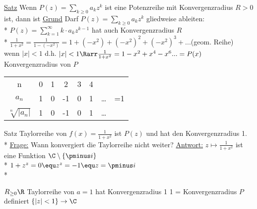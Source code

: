 \ul{Satz} Wenn $P(z) = \sum_{k \geq 0} a_k z^k$ ist eine Potenzreihe mit Konvergenzradius $R > 0$ ist, dann ist
\ul{Grund} Darf $P(z) = \sum_{k \geq 0} a_k z^k$ gliedweise ableiten:\\*
$P(z) = \sum_{k=1}^{\infty} k\cdot a_k z^{k-1}$ hat auch Konvergenzradius $R$\\*
$\frac{1}{1+x^2} = \frac{1}{1 - (-x^2)} = 1 + (-x^2) + (-x^2)^2 + (-x^2)^3 + ... $(geom. Reihe)\\
wenn $|x| < 1$ d.h. $|x| < 1 \Rarr \frac{1}{1+x^2} = 1 - x^2 + x^4 - x^6 ... = P(x)$\\
Konvergenzradius von $P$
\begin{tabular}{c|cccccc|c}
n&0&1&2&3&4&&\hline
\\$a_n$&1&0&-1&0&1&…&=1
\\$\sqrt[n]{|a_n|}$
&1&0&-1&0&1&…&\end{tabular}
Satz \Rarr{} Taylorreihe von $f(x) = \frac{1}{1 + x^2}$ ist $P(z)$ und hat den Konvergenzradius 1.\\*
\ul{Frage:} Wann konvergiert die Taylorreihe nicht weiter?
\ul{Antwort:} $z \mapsto \frac{1}{1 + x^2}$ ist eine Funktion $\C \setminus \{\pminus i\}$\\*
$1+z^z = 0 \equ z^z = -1 \equ z = \pminus i$\\*
$R_{\geq 0} \R$ Taylorreihe von $a=1$ hat Konvergenzradius 1
1 = Konvergenzradius \Rarr{} $P$ definiert $\{|z| < 1\} \to \C$


